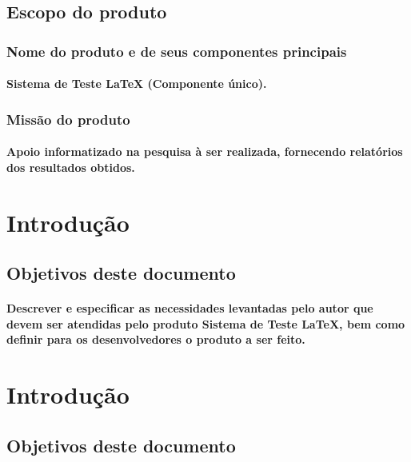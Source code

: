\documentclass{article}
\begin{document}
	\subsection{Escopo do produto}
		\subsubsection{Nome do produto e de seus componentes principais}
			\paragraph{Sistema de Teste LaTeX (Componente único). }
		\subsubsection{Missão do produto}
			\paragraph{Apoio informatizado na pesquisa à ser realizada, fornecendo relatórios dos resultados obtidos.}
			

\newpage

\section{Introdução}
	\subsection{Objetivos deste documento}
		\paragraph{Descrever e especificar as necessidades levantadas pelo autor que devem ser atendidas pelo produto Sistema de Teste LaTeX, bem como definir para os desenvolvedores o produto a ser feito.}


\newpage

\section{Introdução}
	\subsection{Objetivos deste documento}
\end{document}
